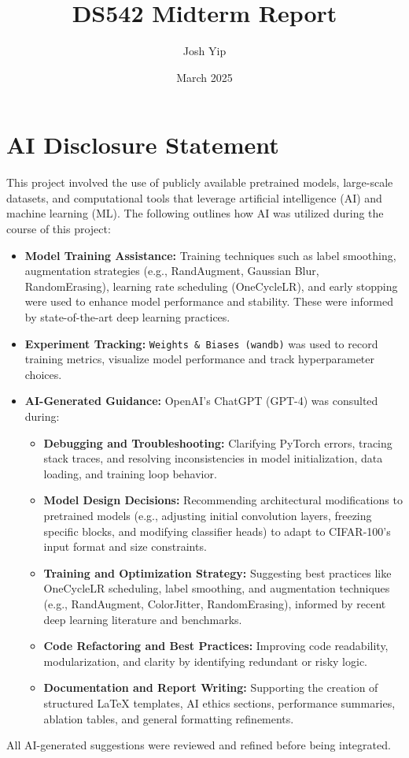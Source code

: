 \documentclass{article}
\title{DS542 Midterm Report}
\author{Josh Yip}
\date{March 2025}
\begin{document}
\maketitle

\section*{AI Disclosure Statement}

This project involved the use of publicly available pretrained models, large-scale datasets, and computational tools that leverage artificial intelligence (AI) and machine learning (ML). The following outlines how AI was utilized during the course of this project:

\begin{itemize}
    \item \textbf{Model Training Assistance:} Training techniques such as label smoothing, augmentation strategies (e.g., RandAugment, Gaussian Blur, RandomErasing), learning rate scheduling (OneCycleLR), and early stopping were used to enhance model performance and stability. These were informed by state-of-the-art deep learning practices.

    \item \textbf{Experiment Tracking:} \texttt{Weights \& Biases (wandb)} was used to record training metrics, visualize model performance and track hyperparameter choices.

    \item \textbf{AI-Generated Guidance:} OpenAI’s ChatGPT (GPT-4) was consulted during:
    \begin{itemize}
        \item \textbf{Debugging and Troubleshooting:} Clarifying PyTorch errors, tracing stack traces, and resolving inconsistencies in model initialization, data loading, and training loop behavior.
        \item \textbf{Model Design Decisions:} Recommending architectural modifications to pretrained models (e.g., adjusting initial convolution layers, freezing specific blocks, and modifying classifier heads) to adapt to CIFAR-100’s input format and size constraints.
        \item \textbf{Training and Optimization Strategy:} Suggesting best practices like OneCycleLR scheduling, label smoothing, and augmentation techniques (e.g., RandAugment, ColorJitter, RandomErasing), informed by recent deep learning literature and benchmarks.
        \item \textbf{Code Refactoring and Best Practices:} Improving code readability, modularization, and clarity by identifying redundant or risky logic.
        \item \textbf{Documentation and Report Writing:} Supporting the creation of structured LaTeX templates, AI ethics sections, performance summaries, ablation tables, and general formatting refinements.
    \end{itemize}
    \end{itemize}
    All AI-generated suggestions were reviewed and refined before being integrated.
\end{document}
